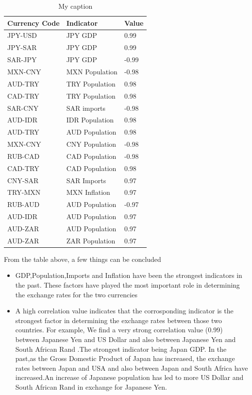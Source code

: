 \begin{table}[]
\centering
\caption{My caption}
\label{my-label}
\begin{tabular}{|l|l|l|}
\hline
Currency Code  & Indicator       & Value \\ \hline
JPY-USD        & JPY GDP         & 0.99  \\ \hline
JPY-SAR        & JPY GDP         & 0.99  \\ \hline
SAR-JPY        & JPY GDP         & -0.99 \\ \hline
MXN-CNY        & MXN Population  & -0.98 \\ \hline
AUD-TRY        & TRY Population  & 0.98  \\ \hline
CAD-TRY        & TRY Population  & 0.98  \\ \hline
SAR-CNY        & SAR imports     & -0.98 \\ \hline
AUD-IDR        & IDR Population  & 0.98  \\ \hline
AUD-TRY        & AUD Population  & 0.98  \\ \hline
MXN-CNY        & CNY Population  & -0.98 \\ \hline
RUB-CAD        & CAD Population  & -0.98 \\ \hline
CAD-TRY        & CAD Population  & 0.98  \\ \hline
CNY-SAR        & SAR Imports     & 0.97  \\ \hline
TRY-MXN        & MXN Inflation   & 0.97  \\ \hline
RUB-AUD        & AUD Population  & -0.97 \\ \hline
AUD-IDR        & AUD Population  & 0.97  \\ \hline
AUD-ZAR        & AUD Population  & 0.97  \\ \hline
AUD-ZAR        & ZAR  Population & 0.97  \\ \hline
\end{tabular}
\end{table}

From the table above, a few things can be concluded

\begin{itemize}
\item GDP,Population,Imports and Inflation have been the strongest indicators in the past\cite{edwards2006relationship}. These factors have played the most important role in determining the exchange rates for the two currencies
\item A high correlation value indicates that the corrosponding indicator is the strongest factor in determining the exchange rates between those two countries\cite{burstein2005large}. For example, We find a very strong correlation value (0.99) between Japanese Yen and US Dollar and also between Japanese Yen and South African Rand .The strongest indicator being Japan GDP. In the past,as the Gross Domestic Product of Japan has increased, the exchange rates between Japan and USA and also between Japan and South Africa have increased.An increase of Japanese population has led to more US Dollar and South African Rand in exchange for Japanese Yen.
\end{itemize}
